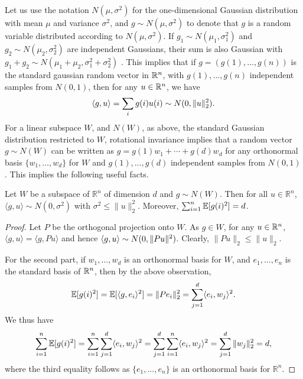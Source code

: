 \medskip 
{} Let us use the notation $N(\mu,\sigma^2)$ for the one-dimensional Gaussian distribution with mean $\mu$ and variance $\sigma^2$, and $g\sim N(\mu,\sigma^2)$ to denote that $g$ is a random variable distributed according to $N(\mu,\sigma^2)$. If $g_1 \sim N(\mu_1,\sigma_1^2)$  and $g_2 \sim N(\mu_2,\sigma_2^2)$ are independent Gaussians, their sum is also Gaussian with $g_1 + g_2 \sim N(\mu_1 + \mu_2, \sigma_1^2 + \sigma_2^2)$ . 
This implies that if $g = (g(1),\ldots,g(n))$ is the standard gaussian random vector in $\mathbb{R}^n$, with $g(1),\ldots,g(n)$ independent samples from $ N(0,1)$, then for any $u \in \mathbb{R}^n$, we have  \[\langle g,u\rangle  = \sum_i g(i) u(i) \sim N(0,\|u\|_2^2).\]
For a linear subspace $W$, and $N(W)$, as above, the standard Gaussian distribution restricted to $W$, rotational invariance implies that a random vector $g \sim N(W)$ can be written as 
$g=  g(1) w_1+ \cdots + g(d) w_d$ for any orthonormal basis
$\{w_1,\ldots,w_d\}$ for $W$ and $g(1),\ldots,g(d)$ independent samples from $N(0,1)$. %
This implies the following useful facts.
\begin{lemma}
\label{lem:gaussian-subspace}
Let $W$ be a subspace of $\mathbb{R}^n$ of dimension $d$ and $g\sim N(W)$. Then for all $u \in \mathbb{R}^n$,  $\langle g,u \rangle \sim N(0,\sigma^2)$ with $\sigma^2 \leq \|u\|_2^2$. Moreover, $\sum_{i=1}^n \mathbb{E}[g(i)^2] = d$.
\end{lemma}
\begin{proof}
Let $P$ be the orthogonal projection onto $W$.
 As $g\in W$, for any $u \in \mathbb{R}^n$, $\langle g,u \rangle  =  \langle g,Pu\rangle$ and  hence $\langle g,u\rangle \sim N(0,\|Pu\|^2)$. Clearly, $\|Pu\|_2 \leq \|u\|_2$. 
 
 For the second part, if $w_1,\ldots,w_d$ is an orthonormal basis for $W$, and $e_1, \ldots, e_n$ is the standard basis of $\mathbb{R}^n$, then by the above observation, 
 \[
 \mathbb{E}[g(i)^2] = \mathbb{E}[\langle g, e_i\rangle^2] = \|Pe_i\|_2^2 =\sum_{j=1}^d \langle e_i,w_j\rangle^2.
 \]
 We thus have
 \begin{align*}
     \sum_{i=1}^n \mathbb{E}[g(i)^2]
     = \sum_{i=1}^n \sum_{j=1}^d \langle e_i,w_j\rangle^2
     = \sum_{j=1}^d \sum_{i=1}^n \langle e_i,w_j\rangle^2
     = \sum_{j=1}^d \|w_j\|_2^2 = d,
 \end{align*}
 where the third equality follows as $\{e_1,\ldots,e_n\}$ is an orthonormal basis for $\mathbb{R}^n$.
 \end{proof}
